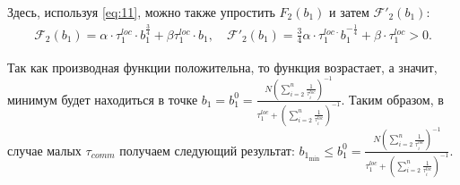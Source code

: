 \documentclass{article}
\theoremstyle{definition}
\theoremstyle{plain}
\begin{document}
\begin{itemize}
    Здесь, используя \eqref{eq:11}, можно также упростить $F_2(b_1)$ и затем $\mathcal{F'}_2(b_1)$:
    \begin{eqnarray*}
        \mathcal F_2(b_1) = \alpha\cdot\tau_1^{loc}\cdot b_1^{\frac{3}{4}} + \beta \tau_1^{loc}\cdot b_1, \quad 
        \mathcal{F'}_2(b_1) = \frac{3}{4}\alpha\cdot\tau_1^{loc\cdot} b_1^{-\frac{1}{4}} + \beta\cdot\tau_1^{loc} > 0.
    \end{eqnarray*}
    
    
    Так как производная функции положительна, то функция возрастает, а значит, минимум будет находиться в точке $b_1 = b_1^{0} = \frac{N (\sum\limits_{i = 2}^{n} \frac{1}{\tau_i^{loc}})^{-1}}{\tau_1^{loc} + (\sum\limits_{i = 2}^{n} \frac{1}{\tau_i^{loc}})^{-1}}.$  
Таким образом, в случае малых $\tau_{comm}$ получаем следующий результат: $b_{1_{\min}} \leq b_1^0 = \frac{N (\sum\limits_{i = 2}^{n} \frac{1}{\tau_i^{loc}})^{-1}}{\tau_1^{loc} + (\sum\limits_{i = 2}^{n} \frac{1}{\tau_i^{loc}})^{-1}}$.
\end{itemize}
\end{document}
